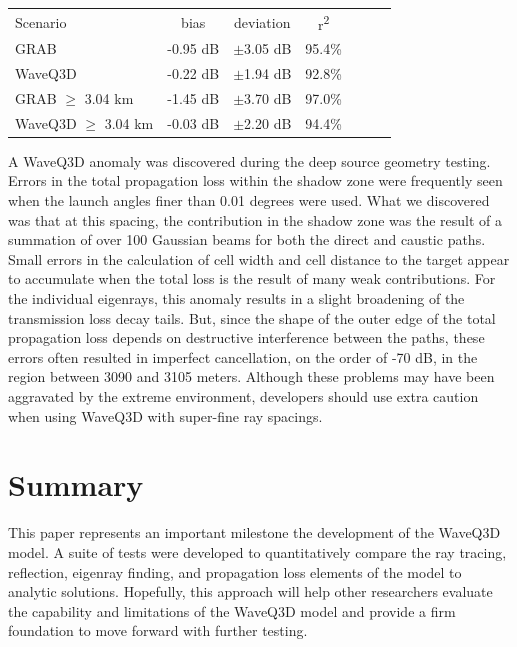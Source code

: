 \documentclass{ws-jca}
\begin{document}
\begin{table}[th]
	{\begin{tabular}{@{}lcccccc@{}} \toprule
		Scenario & bias & deviation & r\textsuperscript{2} \\ \colrule
		GRAB & -0.95 dB & \(\pm\)3.05 dB & 95.4\% \\
		WaveQ3D & -0.22 dB & \(\pm\)1.94 dB & 92.8\% \\
		GRAB \(\geq\) 3.04 km & -1.45 dB & \(\pm\)3.70 dB & 97.0\% \\
		WaveQ3D \(\geq\) 3.04 km & -0.03 dB & \(\pm\)2.20 dB & 94.4\% \\
	\end{tabular}}
\end{table}
A WaveQ3D anomaly was discovered during the deep source geometry testing.
Errors in the total propagation loss within the shadow zone were frequently
seen when the launch angles finer than 0.01 degrees were used. What we
discovered was that at this spacing, the contribution in the shadow zone
was the result of a summation of over 100 Gaussian beams for both the
direct and caustic paths. Small errors in the calculation of cell width and
cell distance to the target appear to accumulate when the total loss is the
result of many weak contributions. For the individual eigenrays, this
anomaly results in a slight broadening of the transmission loss decay
tails. But, since the shape of the outer edge of the total propagation loss
depends on destructive interference between the paths, these errors often
resulted in imperfect cancellation, on the order of -70 dB, in the region
between 3090 and 3105 meters. Although these problems may have been
aggravated by the extreme environment, developers should use extra caution
when using WaveQ3D with super-fine ray spacings.

\section{Summary}

This paper represents an important milestone the development of the WaveQ3D
model. A suite of tests were developed to quantitatively compare the ray
tracing, reflection, eigenray finding, and propagation loss elements of the
model to analytic solutions. Hopefully, this approach will help other
researchers evaluate the capability and limitations of the WaveQ3D model
and provide a firm foundation to move forward with further testing.
\end{document}
